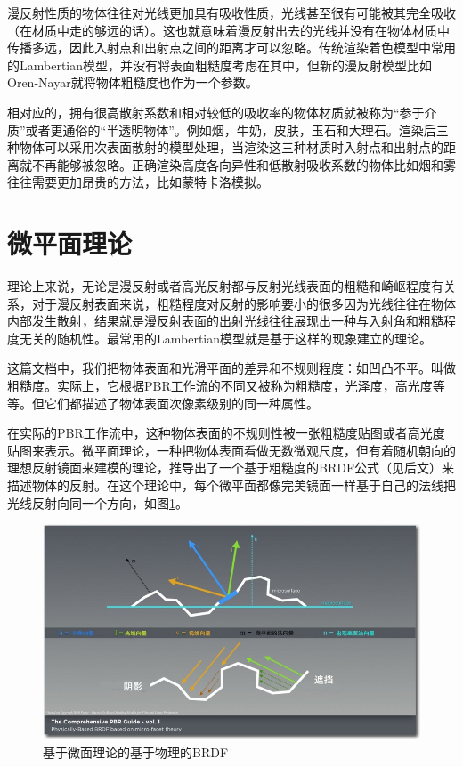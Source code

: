 漫反射性质的物体往往对光线更加具有吸收性质，光线甚至很有可能被其完全吸收（在材质中走的够远的话）。这也就意味着漫反射出去的光线并没有在物体材质中传播多远，因此入射点和出射点之间的距离才可以忽略。传统渲染着色模型中常用的Lambertian模型，并没有将表面粗糙度考虑在其中，但新的漫反射模型比如Oren-Nayar就将物体粗糙度也作为一个参数。

相对应的，拥有很高散射系数和相对较低的吸收率的物体材质就被称为“参于介质”或者更通俗的“半透明物体”。例如烟，牛奶，皮肤，玉石和大理石。渲染后三种物体可以采用次表面散射的模型处理，当渲染这三种材质时入射点和出射点的距离就不再能够被忽略。正确渲染高度各向异性和低散射吸收系数的物体比如烟和雾往往需要更加昂贵的方法，比如蒙特卡洛模拟。

\section{微平面理论}

理论上来说，无论是漫反射或者高光反射都与反射光线表面的粗糙和崎岖程度有关系，对于漫反射表面来说，粗糙程度对反射的影响要小的很多因为光线往往在物体内部发生散射，结果就是漫反射表面的出射光线往往展现出一种与入射角和粗糙程度无关的随机性。最常用的Lambertian模型就是基于这样的现象建立的理论。

这篇文档中，我们把物体表面和光滑平面的差异和不规则程度：如凹凸不平。叫做粗糙度。实际上，它根据PBR工作流的不同又被称为粗糙度，光泽度，高光度等等。但它们都描述了物体表面次像素级别的同一种属性。

在实际的PBR工作流中，这种物体表面的不规则性被一张粗糙度贴图或者高光度贴图来表示。微平面理论，一种把物体表面看做无数微观尺度，但有着随机朝向的理想反射镜面来建模的理论，推导出了一个基于粗糙度的BRDF公式（见后文）来描述物体的反射。在这个理论中，每个微平面都像完美镜面一样基于自己的法线把光线反射向同一个方向，如图\ref{fig:chap1_5}。

\begin{figure}[ht]
    \centering
	\includegraphics[width=\textwidth]{images/chap1_5.jpg}
	\caption{基于微面理论的基于物理的BRDF}
    \label{fig:chap1_5}
\end{figure}

